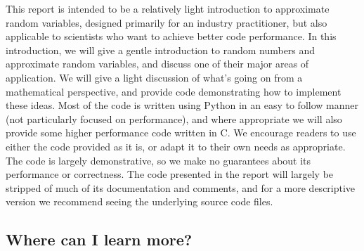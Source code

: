 \documentclass[11pt,a4paper,twoside,english]{extarticle}
\begin{document}
This report is intended to be a relatively light introduction to approximate random variables, designed primarily for an industry practitioner, but also applicable to scientists who want to achieve better code performance. In this introduction, we will give a gentle introduction to random numbers and approximate random variables, and discuss one of their major areas of application. We will give a light discussion of what's going on from a mathematical perspective, and provide code demonstrating how to implement these ideas. Most of the code is written using Python in an easy to follow manner (not particularly focused on performance), and where appropriate we will also provide some higher performance code written in C. We encourage readers to use either the code provided as it is, or adapt it to their own needs as appropriate. The code is largely demonstrative, so we make no guarantees about its performance or correctness. The code presented in the report will largely be stripped of much of its documentation and comments, and for a more descriptive version we recommend seeing the underlying source code files. 

\subsection{Where can I learn more?}
\label{sec:where_can_i_learn_more}
\end{document}
